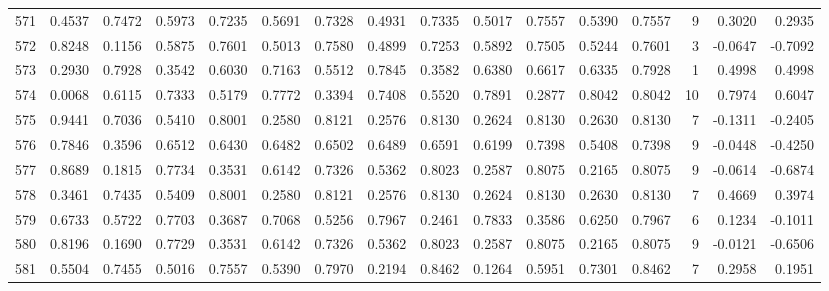 \begin{tabular}{lrrrrrrrrrrrrrrr}
571 &      0.4537 &  0.7472 &  0.5973 &  0.7235 &  0.5691 &  0.7328 &  0.4931 &  0.7335 &  0.5017 &  0.7557 &   0.5390 &     0.7557 &      9 &                    0.3020 &                     0.2935 \\
572 &      0.8248 &  0.1156 &  0.5875 &  0.7601 &  0.5013 &  0.7580 &  0.4899 &  0.7253 &  0.5892 &  0.7505 &   0.5244 &     0.7601 &      3 &                   -0.0647 &                    -0.7092 \\
573 &      0.2930 &  0.7928 &  0.3542 &  0.6030 &  0.7163 &  0.5512 &  0.7845 &  0.3582 &  0.6380 &  0.6617 &   0.6335 &     0.7928 &      1 &                    0.4998 &                     0.4998 \\
574 &      0.0068 &  0.6115 &  0.7333 &  0.5179 &  0.7772 &  0.3394 &  0.7408 &  0.5520 &  0.7891 &  0.2877 &   0.8042 &     0.8042 &     10 &                    0.7974 &                     0.6047 \\
575 &      0.9441 &  0.7036 &  0.5410 &  0.8001 &  0.2580 &  0.8121 &  0.2576 &  0.8130 &  0.2624 &  0.8130 &   0.2630 &     0.8130 &      7 &                   -0.1311 &                    -0.2405 \\
576 &      0.7846 &  0.3596 &  0.6512 &  0.6430 &  0.6482 &  0.6502 &  0.6489 &  0.6591 &  0.6199 &  0.7398 &   0.5408 &     0.7398 &      9 &                   -0.0448 &                    -0.4250 \\
577 &      0.8689 &  0.1815 &  0.7734 &  0.3531 &  0.6142 &  0.7326 &  0.5362 &  0.8023 &  0.2587 &  0.8075 &   0.2165 &     0.8075 &      9 &                   -0.0614 &                    -0.6874 \\
578 &      0.3461 &  0.7435 &  0.5409 &  0.8001 &  0.2580 &  0.8121 &  0.2576 &  0.8130 &  0.2624 &  0.8130 &   0.2630 &     0.8130 &      7 &                    0.4669 &                     0.3974 \\
579 &      0.6733 &  0.5722 &  0.7703 &  0.3687 &  0.7068 &  0.5256 &  0.7967 &  0.2461 &  0.7833 &  0.3586 &   0.6250 &     0.7967 &      6 &                    0.1234 &                    -0.1011 \\
580 &      0.8196 &  0.1690 &  0.7729 &  0.3531 &  0.6142 &  0.7326 &  0.5362 &  0.8023 &  0.2587 &  0.8075 &   0.2165 &     0.8075 &      9 &                   -0.0121 &                    -0.6506 \\
581 &      0.5504 &  0.7455 &  0.5016 &  0.7557 &  0.5390 &  0.7970 &  0.2194 &  0.8462 &  0.1264 &  0.5951 &   0.7301 &     0.8462 &      7 &                    0.2958 &                     0.1951 \\

\end{tabular}
